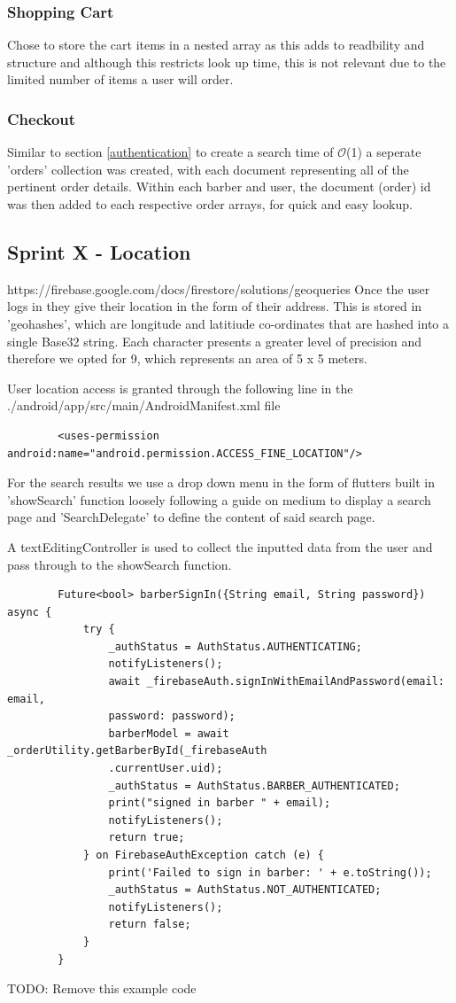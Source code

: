 \documentclass[12pt]{article}
\begin{document}
	\subsubsection{Shopping Cart}
	Chose to store the cart items in a nested array as this adds to readbility and structure and although this restricts look up time, this is not relevant due to the limited number of items a user will order.
	
	\subsubsection{Checkout}
	Similar to section \ref{authentication} to create a search time of $\mathcal{O}$(1) a seperate 'orders' collection was created, with each document representing all of the pertinent order details. Within each barber and user, the document (order) id was then added to each respective order arrays, for quick and easy lookup.
	
	\subsection{Sprint X - Location}
	https://firebase.google.com/docs/firestore/solutions/geoqueries
	Once the user logs in they give their location in the form of their address. This is stored in 'geohashes', which are longitude and latitiude co-ordinates that are hashed into a single Base32 string. Each character presents a greater level of precision and therefore we opted for 9, which represents an area of 5 x 5 meters.
	
	User location access is granted through the following line in the ./android/app/src/main/AndroidManifest.xml file
	\begin{lstlisting}
		<uses-permission android:name="android.permission.ACCESS_FINE_LOCATION"/>
	\end{lstlisting}
	For the search results we use a drop down menu in the form of flutters built in 'showSearch' function loosely following a guide on medium \cite{medium-comerge} to display a search page and 'SearchDelegate' to define the content of said search page.
	
	A textEditingController is used to collect the inputted data from the user and pass through to the showSearch function.
	
	\noindent
	
	\begin{verbatim}
		Future<bool> barberSignIn({String email, String password}) async {
			try {
				_authStatus = AuthStatus.AUTHENTICATING;
				notifyListeners();
				await _firebaseAuth.signInWithEmailAndPassword(email: email, 
				password: password);
				barberModel = await _orderUtility.getBarberById(_firebaseAuth
				.currentUser.uid);
				_authStatus = AuthStatus.BARBER_AUTHENTICATED;
				print("signed in barber " + email);
				notifyListeners();
				return true;
			} on FirebaseAuthException catch (e) {
				print('Failed to sign in barber: ' + e.toString());
				_authStatus = AuthStatus.NOT_AUTHENTICATED;
				notifyListeners();
				return false;
			}
		} 
	\end{verbatim}
	TODO: Remove this example code
	
\end{document}

